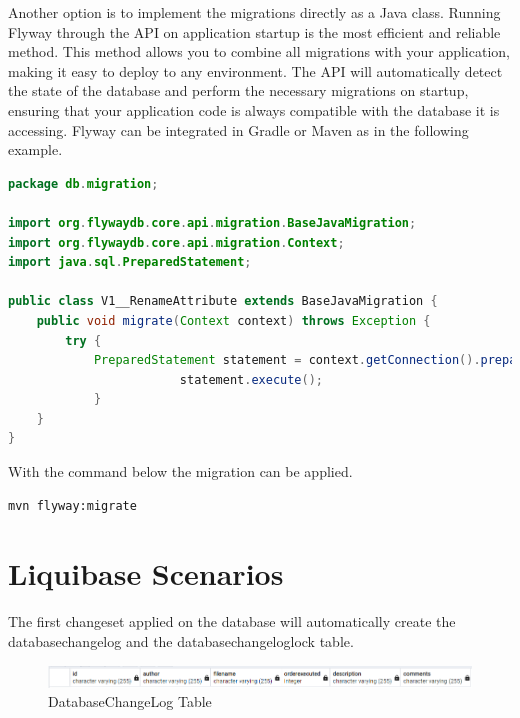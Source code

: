 %
Another option is to implement the migrations directly as a Java class. Running Flyway through the API on application startup is the most efficient and reliable method. This method allows you to combine all migrations with your application, making it easy to deploy to any environment. The API will automatically detect the state of the database and perform the necessary migrations on startup, ensuring that your application code is always compatible with the database it is accessing.
Flyway can be integrated in Gradle or Maven as in the following example.

\begin{lstlisting}[language=Java, caption={File: src/main/java/db/migration/V3\_\_rename\_attribute.sql}]
package db.migration;

import org.flywaydb.core.api.migration.BaseJavaMigration;
import org.flywaydb.core.api.migration.Context;
import java.sql.PreparedStatement;

public class V1__RenameAttribute extends BaseJavaMigration {
	public void migrate(Context context) throws Exception {
		try {
			PreparedStatement statement = context.getConnection().prepareStatement("ALTER TABLE customer RENAME COLUMN email TO private_email;")) {
						statement.execute();
			}
	}
}
\end{lstlisting}

With the command below the migration can be applied.
 \begin{lstlisting}
mvn flyway:migrate
 \end{lstlisting}


\newpage
\section{Liquibase Scenarios}
%
The first changeset applied on the database will automatically create the databasechangelog and the databasechangeloglock table. 

\begin{figure}[H]
	\centering
	\includegraphics[width=\textwidth]{./chapters/scenarios/images/databasechangelog}
	\caption[DatabaseChangeLog Table - Source: Own illustration]{DatabaseChangeLog Table}
	\label{fig:scenarios:LiquibaseDBCL}
\end{figure}

